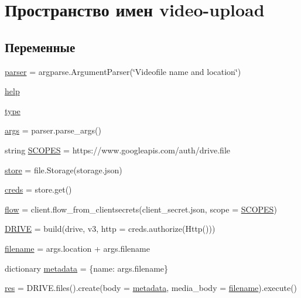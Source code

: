 \hypertarget{namespacevideo-upload}{}\section{Пространство имен video-\/upload}
\label{namespacevideo-upload}
\subsection*{Переменные}
\begin{DoxyCompactItemize}
\item 
\hyperlink{namespacevideo-upload_adb444a75aaa0c0e590807701931bafef}{parser} = argparse.\+Argument\+Parser(\char`\"{}Videofile name and location\char`\"{})
\item 
\hyperlink{namespacevideo-upload_a7febd43c5f8604092229ae1ccf261f0c}{help}
\item 
\hyperlink{namespacevideo-upload_a0aea8bad307fcc1764683855862406c5}{type}
\item 
\hyperlink{namespacevideo-upload_a9e790ab261c9413ed47dafe46c022063}{args} = parser.\+parse\+\_\+args()
\item 
string \hyperlink{namespacevideo-upload_a76e331163a34b55da69ecdf6ca084eab}{S\+C\+O\+P\+ES} = \textquotesingle{}https\+://www.\+googleapis.\+com/auth/drive.\+file\textquotesingle{}
\item 
\hyperlink{namespacevideo-upload_a1bbb99b1568829c7cb6af40564c671d3}{store} = file.\+Storage(\textquotesingle{}storage.\+json\textquotesingle{})
\item 
\hyperlink{namespacevideo-upload_a5c691a1aa9c397a8485738b164fbf511}{creds} = store.\+get()
\item 
\hyperlink{namespacevideo-upload_a7f676962b30f842d93805a11467d4404}{flow} = client.\+flow\+\_\+from\+\_\+clientsecrets(\textquotesingle{}client\+\_\+secret.\+json\textquotesingle{}, scope = \hyperlink{namespacevideo-upload_a76e331163a34b55da69ecdf6ca084eab}{S\+C\+O\+P\+ES})
\item 
\hyperlink{namespacevideo-upload_a70c1c74c0d69dbc8748f55e9678bd7e8}{D\+R\+I\+VE} = build(\textquotesingle{}drive\textquotesingle{}, \textquotesingle{}v3\textquotesingle{}, http = creds.\+authorize(Http()))
\item 
\hyperlink{namespacevideo-upload_a8f0c224b0d6326d66b6a471fb3ae06b7}{filename} = args.\+location + args.\+filename
\item 
dictionary \hyperlink{namespacevideo-upload_a078e77756bf147602ea81c2485e0b3ca}{metadata} = \{\textquotesingle{}name\textquotesingle{}\+: args.\+filename\}
\item 
\hyperlink{namespacevideo-upload_a98d77aa7929949660affdd840263f994}{res} = D\+R\+I\+V\+E.\+files().create(body = \hyperlink{namespacevideo-upload_a078e77756bf147602ea81c2485e0b3ca}{metadata}, media\+\_\+body = \hyperlink{namespacevideo-upload_a8f0c224b0d6326d66b6a471fb3ae06b7}{filename}).execute()
\end{DoxyCompactItemize}



